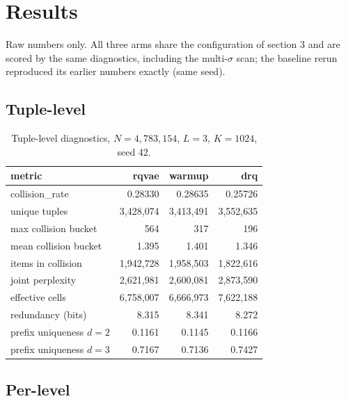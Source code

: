 \documentclass[11pt]{article}
\begin{document}
\section{Results}

Raw numbers only. All three arms share the configuration of section 3 and are
scored by the same diagnostics, including the multi-$\sigma$ scan; the baseline
rerun reproduced its earlier numbers exactly (same seed).

\subsection{Tuple-level}

\begin{table}[h]
\centering
\begin{tabular}{lrrr}
\toprule
metric & rqvae & warmup & drq \\
\midrule
collision\_rate           & 0.28330 & 0.28635 & 0.25726 \\
unique tuples             & 3{,}428{,}074 & 3{,}413{,}491 & 3{,}552{,}635 \\
max collision bucket      & 564    & 317    & 196    \\
mean collision bucket     & 1.395  & 1.401  & 1.346  \\
items in collision        & 1{,}942{,}728 & 1{,}958{,}503 & 1{,}822{,}616 \\
joint perplexity          & 2{,}621{,}981 & 2{,}600{,}081 & 2{,}873{,}590 \\
effective cells           & 6{,}758{,}007 & 6{,}666{,}973 & 7{,}622{,}188 \\
redundancy (bits)         & 8.315  & 8.341  & 8.272  \\
prefix uniqueness $d{=}2$ & 0.1161 & 0.1145 & 0.1166 \\
prefix uniqueness $d{=}3$ & 0.7167 & 0.7136 & 0.7427 \\
\bottomrule
\end{tabular}
\caption{Tuple-level diagnostics, $N = 4{,}783{,}154$, $L=3$, $K=1024$, seed 42.}
\end{table}

\subsection{Per-level}
\end{document}
